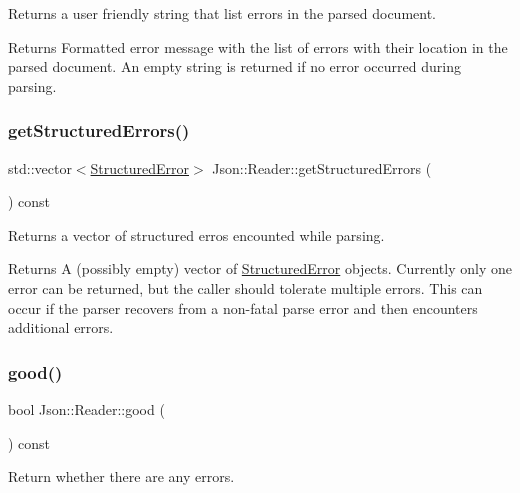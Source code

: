 Returns a user friendly string that list errors in the parsed document. 

\begin{DoxyReturn}{Returns}
Formatted error message with the list of errors with their location in the parsed document. An empty string is returned if no error occurred during parsing. 
\end{DoxyReturn}
\mbox{\label{class_json_1_1_reader_afa5aa28e5345b4a90c411a206b1d63b1}} 
\subsubsection{\texorpdfstring{getStructuredErrors()}{getStructuredErrors()}}
{\footnotesize\ttfamily std\+::vector$<$\mbox{\hyperlink{struct_json_1_1_reader_1_1_structured_error}{Structured\+Error}}$>$ Json\+::\+Reader\+::get\+Structured\+Errors (\begin{DoxyParamCaption}{ }\end{DoxyParamCaption}) const}



Returns a vector of structured erros encounted while parsing. 

\begin{DoxyReturn}{Returns}
A (possibly empty) vector of \mbox{\hyperlink{struct_json_1_1_reader_1_1_structured_error}{Structured\+Error}} objects. Currently only one error can be returned, but the caller should tolerate multiple errors. This can occur if the parser recovers from a non-\/fatal parse error and then encounters additional errors. 
\end{DoxyReturn}
\mbox{\label{class_json_1_1_reader_a86cbb42b3e6d4a4d6416473b1a8f6ae7}} 
\subsubsection{\texorpdfstring{good()}{good()}}
{\footnotesize\ttfamily bool Json\+::\+Reader\+::good (\begin{DoxyParamCaption}{ }\end{DoxyParamCaption}) const}



Return whether there are any errors. 

